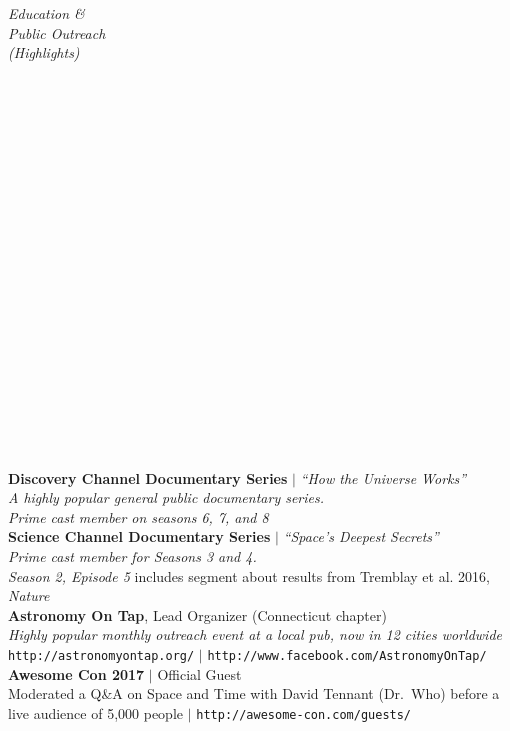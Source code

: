 \documentclass[11pt]{article}
\begin{document}
\vspace{4mm}



\hspace{2.5mm} \parbox{1.5in}{\textit{Education \& \\ Public Outreach \\ (Highlights) \\\\\\\\\\\\\\\\\\\\\\\\\\\\\\\\\\\\\\\\\\}} \parbox{5.15in}{
\textbf{Discovery Channel Documentary Series} $|$ \textit{``How the Universe Works''} \\
\textit{A highly popular general public documentary series. \\Prime cast member on seasons 6, 7, and 8}\\

\textbf{Science Channel Documentary Series} $|$ \textit{``Space's Deepest Secrets''} \\
\textit{Prime cast member for Seasons 3 and 4.}\\
\textit{Season 2, Episode 5} includes segment about results from Tremblay et al. 2016, \textit{Nature}\\




\textbf{Astronomy On Tap}, Lead Organizer (Connecticut chapter) \\
\textit{Highly popular monthly outreach event at a local pub, now in 12 cities worldwide} \\
{\footnotesize \texttt{http://astronomyontap.org/}} $|$ {\footnotesize \texttt{http://www.facebook.com/AstronomyOnTap/}} \\


\textbf{Awesome Con 2017} $|$ Official Guest \\
Moderated a Q\&A on Space and Time with David Tennant (Dr.~Who) before a live audience of 5,000 people $|$ \texttt{http://awesome-con.com/guests/}  \\



}
\end{document}
